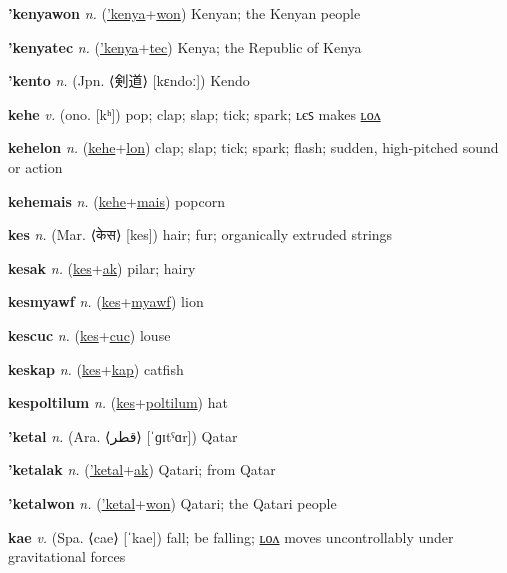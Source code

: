 \textbf{\hypertarget{'kenyawon}{'kenyawon}} \textit{n.} (\hyperlink{'kenya}{'kenya}+\allowbreak \hyperlink{won}{won})
Kenyan; the Kenyan people

\textbf{\hypertarget{'kenyatec}{'kenyatec}} \textit{n.} (\hyperlink{'kenya}{'kenya}+\allowbreak \hyperlink{tec}{tec})
Kenya; the Republic of Kenya

\textbf{\hypertarget{'kento}{'kento}} \textit{n.} (Jpn. ⟨{\japanese{}剣道}⟩ [kɛndoː])
Kendo

\textbf{\hypertarget{kehe}{kehe}} \textit{v.} (ono. [kʰ])
pop; clap; slap; tick; spark; ʟєꜱ makes \hyperlink{kehelon}{ʟᴏᴧ}

\textbf{\hypertarget{kehelon}{kehelon}} \textit{n.} (\hyperlink{kehe}{kehe}+\allowbreak \hyperlink{lon}{lon})
clap; slap; tick; spark; flash; sudden, high-pitched sound or action

\textbf{\hypertarget{kehemais}{kehemais}} \textit{n.} (\hyperlink{kehe}{kehe}+\allowbreak \hyperlink{mais}{mais})
popcorn

\textbf{\hypertarget{kes}{kes}} \textit{n.} (Mar. ⟨{\devanagari{}केस}⟩ [kes])
hair; fur; organically extruded strings

\textbf{\hypertarget{kesak}{kesak}} \textit{n.} (\hyperlink{kes}{kes}+\allowbreak \hyperlink{ak}{ak})
pilar; hairy

\textbf{\hypertarget{kesmyawf}{kesmyawf}} \textit{n.} (\hyperlink{kes}{kes}+\allowbreak \hyperlink{myawf}{myawf})
lion

\textbf{\hypertarget{kescuc}{kescuc}} \textit{n.} (\hyperlink{kes}{kes}+\allowbreak \hyperlink{cuc}{cuc})
louse

\textbf{\hypertarget{keskap}{keskap}} \textit{n.} (\hyperlink{kes}{kes}+\allowbreak \hyperlink{kap}{kap})
catfish

\textbf{\hypertarget{kespoltilum}{kespoltilum}} \textit{n.} (\hyperlink{kes}{kes}+\allowbreak \hyperlink{poltilum}{poltilum})
hat

\textbf{\hypertarget{'ketal}{'ketal}} \textit{n.} (Ara. ⟨{\arabics{}قطر‎}⟩ [ˈɡɪtˤɑr])
Qatar

\textbf{\hypertarget{'ketalak}{'ketalak}} \textit{n.} (\hyperlink{'ketal}{'ketal}+\allowbreak \hyperlink{ak}{ak})
Qatari; from Qatar

\textbf{\hypertarget{'ketalwon}{'ketalwon}} \textit{n.} (\hyperlink{'ketal}{'ketal}+\allowbreak \hyperlink{won}{won})
Qatari; the Qatari people

\textbf{\hypertarget{kae}{kae}} \textit{v.} (Spa. ⟨cae⟩ [ˈkae])
fall; be falling; \hyperlink{kaelon}{ʟᴏᴧ} moves uncontrollably under gravitational forces

